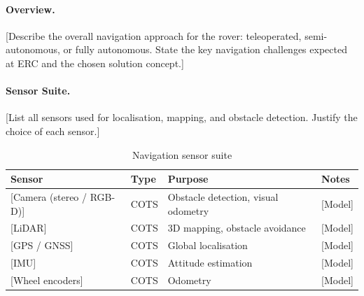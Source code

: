 %

\paragraph{Overview.}
[Describe the overall navigation approach for the rover: teleoperated,
semi-autonomous, or fully autonomous. State the key navigation challenges
expected at ERC and the chosen solution concept.]

\paragraph{Sensor Suite.}
[List all sensors used for localisation, mapping, and obstacle detection.
Justify the choice of each sensor.]

\begin{table}[H]
    \centering
    \caption{Navigation sensor suite}
    \label{tab:nav_sensors}
    \begin{tabular}{L{3.5cm} L{2cm} L{3.5cm} L{3cm}}
        \toprule
        \textbf{Sensor}      & \textbf{Type} & \textbf{Purpose} & \textbf{Notes} \\
        \midrule
        {[Camera (stereo / RGB-D)]} & COTS & Obstacle detection, visual odometry & [Model] \\
        {[LiDAR]}                   & COTS & 3D mapping, obstacle avoidance      & [Model] \\
        {[GPS / GNSS]}              & COTS & Global localisation                 & [Model] \\
        {[IMU]}                     & COTS & Attitude estimation                 & [Model] \\
        {[Wheel encoders]}          & COTS & Odometry                            & [Model] \\
        \bottomrule
    \end{tabular}
\end{table}

